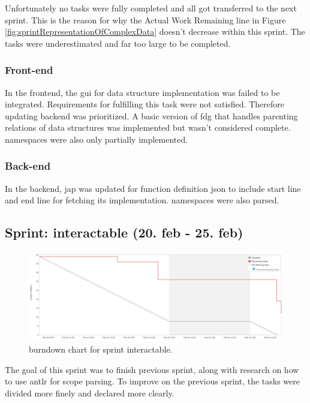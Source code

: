 Unfortunately no tasks were fully completed and all got transferred to the next \gls{sprint}. This is the reason for why the Actual Work Remaining line in Figure \ref{fig:sprintRepresentationOfComplexData} doesn't decrease within this \gls{sprint}. The tasks were underestimated and far too large to be completed.

\subsubsection{Front-end}
In the \gls{frontend}, the \gls{gui} for data structure implementation was failed to be integrated. Requirements for fulfilling this task were not satisfied. Therefore updating \gls{backend} was prioritized.
A basic version of \gls{fdg} that handles parenting relations of data structures was implemented but wasn't considered complete. \Glspl{namespace} were also only partially implemented.

\subsubsection{Back-end}
In the \gls{backend}, \gls{jap} was updated for function definition \gls{json} to include start line and end line for fetching its implementation. \Glspl{namespace} were also parsed.


\subsection{Sprint: interactable (20. feb - 25. feb)}
\begin{figure}[H] 
    \includegraphics[width=\textwidth]{inc/images/sprints/sprintInteractable200219-250219.png}
    \caption{\Gls{burndown} chart for \gls{sprint} interactable.}
    \label{fig:sprintInteractable}
\end{figure}
The goal of this \gls{sprint} was to finish previous sprint, along with research on how to use \gls{antlr} for scope parsing. To improve on the previous \gls{sprint}, the tasks were divided more finely and declared more clearly.

